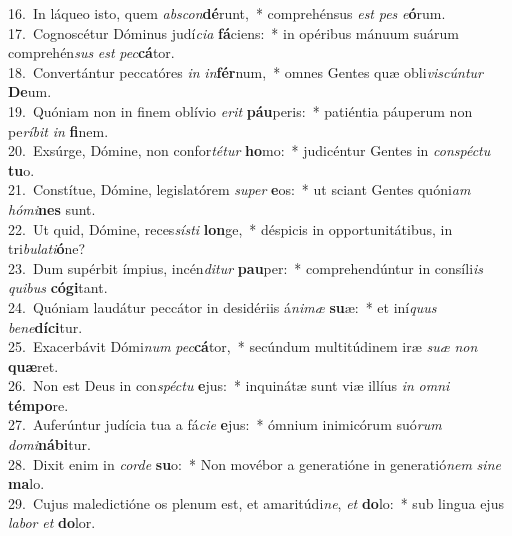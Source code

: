 {16.~}In láqueo isto, quem \textit{ab}\textit{scon}\textbf{dé}runt,~* comprehénsus \textit{est} \textit{pes} \textit{e}\textbf{ó}rum.\\
{17.~}Cognoscétur Dóminus judí\textit{ci}\textit{a} \textbf{fá}ciens:~* in opéribus mánuum suárum comprehén\textit{sus} \textit{est} \textit{pec}\textbf{cá}tor.\\
{18.~}Convertántur peccatóres \textit{in} \textit{in}\textbf{fér}num,~* omnes Gentes quæ obli\textit{vi}\textit{scún}\textit{tur} \textbf{De}um.\\
{19.~}Quóniam non in finem oblívio \textit{e}\textit{rit} \textbf{páu}peris:~* patiéntia páuperum non pe\textit{rí}\textit{bit} \textit{in} \textbf{fi}nem.\\
{20.~}Exsúrge, Dómine, non confor\textit{té}\textit{tur} \textbf{ho}mo:~* judicéntur Gentes in \textit{con}\textit{spé}\textit{ctu} \textbf{tu}o.\\
{21.~}Constítue, Dómine, legislatórem \textit{su}\textit{per} \textbf{e}os:~* ut sciant Gentes quóni\textit{am} \textit{hó}\textit{mi}\textbf{nes} sunt.\\
{22.~}Ut quid, Dómine, reces\textit{sí}\textit{sti} \textbf{lon}ge,~* déspicis in opportunitátibus, in tri\textit{bu}\textit{la}\textit{ti}\textbf{ó}ne?\\
{23.~}Dum supérbit ímpius, incén\textit{di}\textit{tur} \textbf{pau}per:~* comprehendúntur in consíli\textit{is} \textit{qui}\textit{bus} \textbf{có}\textbf{gi}tant.\\
{24.~}Quóniam laudátur peccátor in desidériis á\textit{ni}\textit{mæ} \textbf{su}æ:~* et iní\textit{quus} \textit{be}\textit{ne}\textbf{dí}\textbf{ci}tur.\\
{25.~}Exacerbávit Dómi\textit{num} \textit{pec}\textbf{cá}tor,~* secúndum multitúdinem iræ \textit{su}\textit{æ} \textit{non} \textbf{quæ}ret.\\
{26.~}Non est Deus in con\textit{spé}\textit{ctu} \textbf{e}jus:~* inquinátæ sunt viæ illíus \textit{in} \textit{om}\textit{ni} \textbf{tém}\textbf{po}re.\\
{27.~}Auferúntur judícia tua a fá\textit{ci}\textit{e} \textbf{e}jus:~* ómnium inimicórum suó\textit{rum} \textit{do}\textit{mi}\textbf{ná}\textbf{bi}tur.\\
{28.~}Dixit enim in \textit{cor}\textit{de} \textbf{su}o:~* Non movébor a generatióne in generatió\textit{nem} \textit{si}\textit{ne} \textbf{ma}lo.\\
{29.~}Cujus maledictióne os plenum est, et amaritúdi\textit{ne}, \textit{et} \textbf{do}lo:~* sub lingua ejus \textit{la}\textit{bor} \textit{et} \textbf{do}lor.\\
